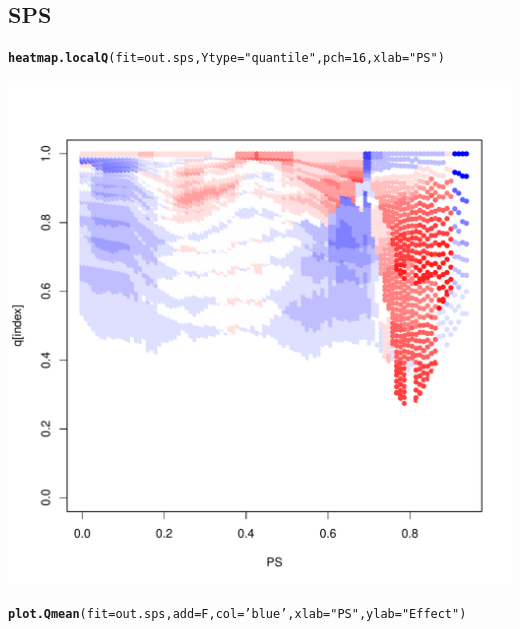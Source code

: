 \documentclass{article}\usepackage[]{graphicx}\usepackage[]{color}
\makeatletter
\def\maxwidth{ %
  \ifdim\Gin@nat@width>\linewidth
    \linewidth
  \else
    \Gin@nat@width
  \fi
}
\newcommand{\hlnum}[1]{\textcolor[rgb]{0.686,0.059,0.569}{#1}}%
\newcommand{\hlstr}[1]{\textcolor[rgb]{0.192,0.494,0.8}{#1}}%
\newcommand{\hlstd}[1]{\textcolor[rgb]{0.345,0.345,0.345}{#1}}%
\newcommand{\hlkwc}[1]{\textcolor[rgb]{0.333,0.667,0.333}{#1}}%
\newcommand{\hlkwd}[1]{\textcolor[rgb]{0.737,0.353,0.396}{\textbf{#1}}}%
\newenvironment{kframe}{%
 \def\at@end@of@kframe{}%
 \ifinner\ifhmode%
  \def\at@end@of@kframe{\end{minipage}}%
  \begin{minipage}{\columnwidth}%
 \fi\fi%
 \def\FrameCommand##1{\hskip\@totalleftmargin \hskip-\fboxsep
 \colorbox{shadecolor}{##1}\hskip-\fboxsep
     \hskip-\linewidth \hskip-\@totalleftmargin \hskip\columnwidth}%
 \MakeFramed {\advance\hsize-\width
   \@totalleftmargin\z@ \linewidth\hsize
   \@setminipage}}%
 {\par\unskip\endMakeFramed%
 \at@end@of@kframe}
\newenvironment{knitrout}{}{} %
\makeatother
\begin{document}
\subsection{SPS}
\begin{knitrout}
\color{fgcolor}\begin{kframe}
\begin{alltt}
\hlkwd{heatmap.localQ}\hlstd{(}\hlkwc{fit}\hlstd{=out.sps ,} \hlkwc{Ytype}\hlstd{=}\hlstr{"quantile"} \hlstd{,} \hlkwc{pch}\hlstd{=}\hlnum{16} \hlstd{,} \hlkwc{xlab}\hlstd{=}\hlstr{"PS"}\hlstd{)}
\end{alltt}
\end{kframe}

{\centering \includegraphics[width=\maxwidth]{figures/SPS-heatmap-1} 

}


\begin{kframe}\begin{alltt}
\hlkwd{plot.Qmean}\hlstd{(}\hlkwc{fit}\hlstd{=out.sps ,} \hlkwc{add}\hlstd{=F ,} \hlkwc{col}\hlstd{=}\hlstr{'blue'} \hlstd{,} \hlkwc{xlab}\hlstd{=}\hlstr{"PS"} \hlstd{,} \hlkwc{ylab}\hlstd{=}\hlstr{"Effect"}\hlstd{)}
\end{alltt}
\end{kframe}


\end{knitrout}
\end{document}

